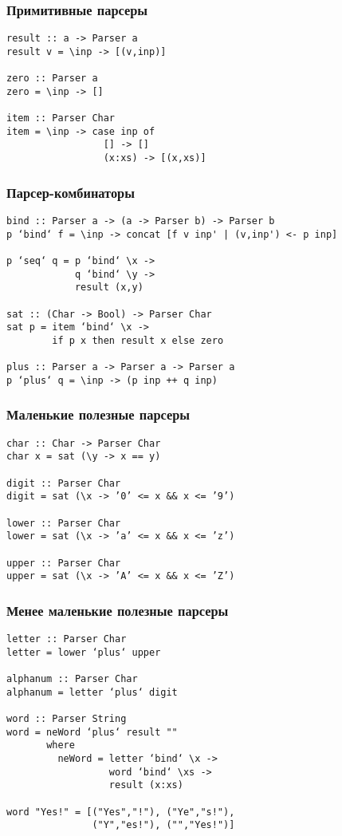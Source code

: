 \documentclass{beamer}
\begin{document}
\begin{frame}[fragile]
  \transwipe[direction=90]
  \frametitle{Примитивные парсеры}
\begin{verbatim}
result :: a -> Parser a
result v = \inp -> [(v,inp)]

zero :: Parser a
zero = \inp -> []

item :: Parser Char
item = \inp -> case inp of
                 [] -> []
                 (x:xs) -> [(x,xs)]
\end{verbatim}  
\end{frame}

\begin{frame}[fragile]
  \transwipe[direction=90]
  \frametitle{Парсер-комбинаторы}
\begin{verbatim}
bind :: Parser a -> (a -> Parser b) -> Parser b
p ‘bind‘ f = \inp -> concat [f v inp' | (v,inp') <- p inp]

p ‘seq‘ q = p ‘bind‘ \x ->
            q ‘bind‘ \y ->
            result (x,y)

sat :: (Char -> Bool) -> Parser Char
sat p = item ‘bind‘ \x ->
        if p x then result x else zero

plus :: Parser a -> Parser a -> Parser a
p ‘plus‘ q = \inp -> (p inp ++ q inp)
\end{verbatim}
\end{frame}

\begin{frame}[fragile]
  \transwipe[direction=90]
  \frametitle{Маленькие полезные парсеры}
\begin{verbatim}
char :: Char -> Parser Char
char x = sat (\y -> x == y)

digit :: Parser Char
digit = sat (\x -> ’0’ <= x && x <= ’9’)

lower :: Parser Char
lower = sat (\x -> ’a’ <= x && x <= ’z’)

upper :: Parser Char
upper = sat (\x -> ’A’ <= x && x <= ’Z’)
\end{verbatim}
\end{frame}

\begin{frame}[fragile]
  \transwipe[direction=90]
  \frametitle{Менее маленькие полезные парсеры}
\begin{verbatim}
letter :: Parser Char
letter = lower ‘plus‘ upper

alphanum :: Parser Char
alphanum = letter ‘plus‘ digit

word :: Parser String
word = neWord ‘plus‘ result ""
       where
         neWord = letter ‘bind‘ \x ->
                  word ‘bind‘ \xs ->
                  result (x:xs)

word "Yes!" = [("Yes","!"), ("Ye","s!"), 
               ("Y","es!"), ("","Yes!")]
\end{verbatim}
\end{frame}
\end{document}
